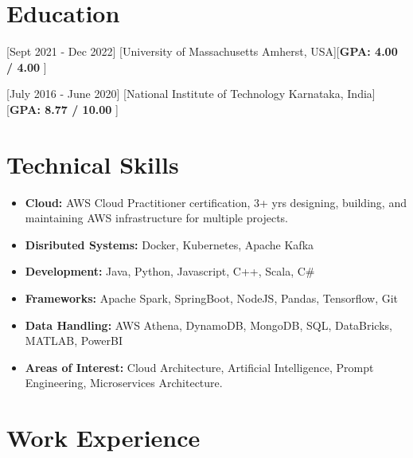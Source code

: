 \documentclass{article}
\begin{document}

\makecvtitle %


\section{Education}

[Sept 2021 - Dec 2022]
[University of Massachusetts Amherst, USA][\textbf{GPA: 4.00 / 4.00 }]

[July 2016 - June 2020]
[National Institute of Technology Karnataka, India] [\textbf{GPA: 8.77 / 10.00 }]


\section{Technical Skills}

\begin{itemize}
\item \textbf{Cloud:} AWS Cloud Practitioner certification, 3+ yrs designing, building, and maintaining AWS infrastructure for multiple projects.
\item \textbf{Disributed Systems:} Docker, Kubernetes, Apache Kafka
\item \textbf{Development:} Java, Python, Javascript, C++, Scala, C\#
\item \textbf{Frameworks:} Apache Spark, SpringBoot, NodeJS, Pandas, Tensorflow, Git
\item \textbf{Data Handling:} AWS Athena, DynamoDB, MongoDB, SQL, DataBricks, MATLAB, PowerBI
\item \textbf{Areas of Interest:} Cloud Architecture, Artificial Intelligence, Prompt Engineering, Microservices Architecture.

\end{itemize}


\section{Work Experience}
\end{document}
